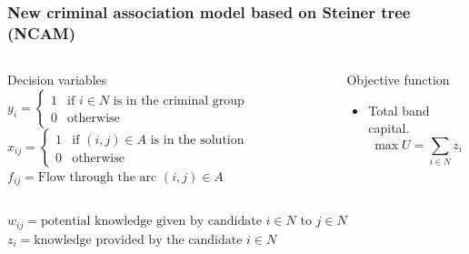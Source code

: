 \documentclass[aspectratio=169]{beamer}
\begin{document}
\begin{frame}
\frametitle{New criminal association model based on Steiner tree (NCAM)}
\begin{columns}
    \begin{block}{Decision variables}
      \vspace{1em}
      $y_{i} =
        \begin{cases}
          1 & \text{if $i \in N$ is in the criminal group} \\
          0 & \text{otherwise}
        \end{cases}$ \\
      $x_{ij} =
        \begin{cases}
          1 & \text{if $(i,j) \in A$ is in the solution} \\
          0 & \text{otherwise}
        \end{cases}$ \\
      $f_{ij} = \text{Flow through the arc $(i,j) \in A$}$
    \end{block}
\begin{block}{Objective function}
  \begin{itemize}
    \item Total band capital.
    \begin{equation*}
      \max U = \sum_{i \in N} z_i
    \end{equation*}
  \end{itemize}
\end{block}
\end{columns}
\begin{columns}
    \begin{block}{}
      $w_{ij} = \text{potential knowledge given by candidate $i \in N$ to $j \in N$}$ \\
      $z_{i} =  \text{knowledge provided by the candidate $i \in N$}$
    \end{block}
\end{columns}
\end{frame}
\end{document}
